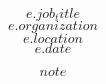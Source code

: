 

\begin{cventries}

  \cventry
    {$$e.job_title$$} %
    {$$e.organization$$} %
    {$$e.location$$} %
    {$$e.date$$} %
    {
      \begin{cvitems} %
        \item{$$note$$} 
      \end{cvitems}
	}
\end{cventries}
